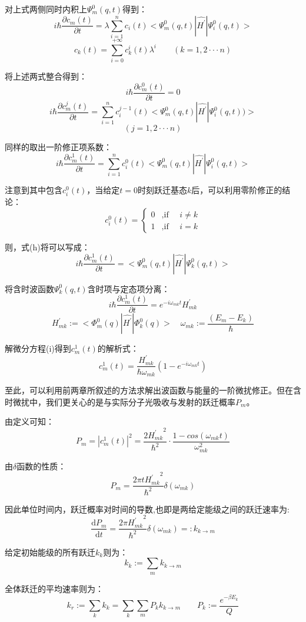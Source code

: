对上式两侧同时内积上$\varPsi_m^0(q,t)$得到：
\[i \hbar \frac{\partial c_m(t)}{\partial t}=\lambda\sum_{i=1}^nc_i(t)<\varPsi_m^0(q,t)|\hat{H^{'}}|\varPsi_i^0(q,t)>\]
\[c_k(t)=\sum_{i=0}^{+\infty}c_k^i(t)\lambda^i \qquad (k=1,2 \cdot\cdot\cdot n)\]

将上述两式整合得到：
\[i \hbar \frac{\partial c_m^0(t)}{\partial t}=0\]
\[i \hbar \frac{\partial c_m^j(t)}{\partial t}=\sum_{i=1}^nc_i^{j-1}(t)<\varPsi_m^0(q,t)|\hat{H^{'}}|\varPsi_i^0(q,t))>\]
\[(j=1,2 \cdot\cdot\cdot n)\]

同样的取出一阶修正项系数：
\[i \hbar \frac{\partial c_m^1(t)}{\partial t}=\sum_{i=1}^nc_i^0(t)<\varPsi_m^0(q,t)|\hat{H^{'}}|\varPsi_i^0(q,t)> \tag{h}\]

注意到其中包含$c_i^0(t)$，当给定$t=0$时刻跃迁基态$k$后，可以利用零阶修正的结论：
\[c_i^0(t) = \left\{
\begin{array}{rl}
0 & \text{,if  }\quad i \neq k\\
1 & \text{,if  }\quad i=k
\end{array} \right. \]

则，式(h)将可以写成：
\[i \hbar \frac{\partial c_m^1(t)}{\partial t}=<\varPsi_m^0(q,t)|\hat{H^{'}}|\varPsi_k^0(q,t)>\]

将含时波函数$\varPsi_k^0(q,t)$含时项与定态项分离：
\[i \hbar \frac{\partial c_m^1(t)}{\partial t}=e^{-i \omega_{mk} t}H^{'}_{mk} \tag{i}\]
\[H^{'}_{mk}:=<\varPhi_m^0(q)|\hat{H^{'}}|\varPhi_k^0(q)> \quad \omega_{mk}:=\frac{(E_m-E_k)}{\hbar}\]

解微分方程(i)得到$c_m^1(t)$的解析式：
\[c_m^1(t)=\frac{H^{'}_{mk}}{\hbar \omega_{mk}}(1-e^{-i \omega_{mk} t})\]

至此，可以利用前两章所叙述的方法求解出波函数与能量的一阶微扰修正。但在含时微扰中，我们更关心的是与实际分子光吸收与发射的跃迁概率$P_m$。

由定义可知：
\[P_m=|c_m^1(t)|^2=\frac{2{H^{'}_{mk}}^2}{\hbar^2 } \cdot \frac{1-cos(\omega_{mk}t)}{\omega_{mk}^2}\]

由$\delta$函数的性质：
\[P_m=\frac{2 \pi t{H^{'}_{mk}}^2}{\hbar^2 }\delta(\omega_{mk})\]

因此单位时间内，跃迁概率对时间的导数,也即是两给定能级之间的跃迁速率为:
\[\frac{\mathrm{d} P_m}{\mathrm{d} t}=\frac{2 \pi {H^{'}_{mk}}^2}{\hbar^2 }\delta(\omega_{mk})=:k_{k \rightarrow m}\]

给定初始能级的所有跃迁$k_{k}$则为：
\[k_{k}:=\sum_mk_{k \rightarrow m}\]

全体跃迁的平均速率则为：
\[k_r:=\sum_kk_{k}=\sum_k\sum_m P_k k_{k \rightarrow m} \qquad P_k:=\frac{e^{-\beta E_k}}{Q}\]

